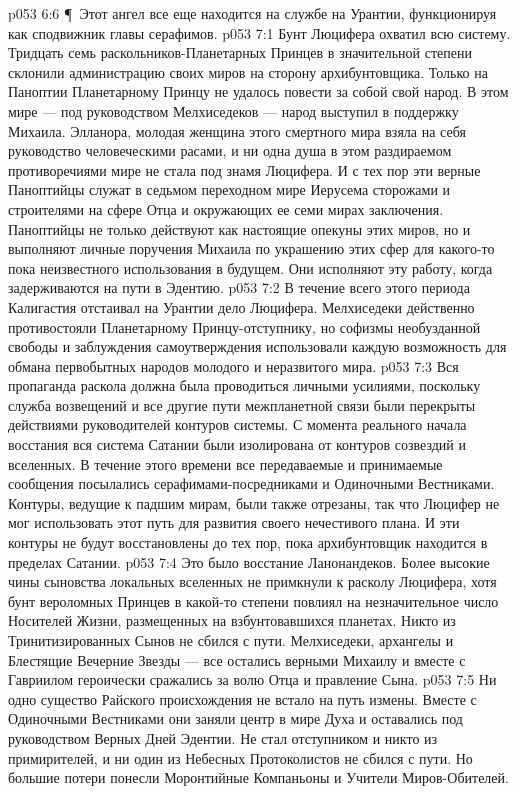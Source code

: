 \vs p053 6:6 \P\ Этот ангел все еще находится на службе на Урантии, функционируя как сподвижник главы серафимов.
\vs p053 7:1 Бунт Люцифера охватил всю систему. Тридцать семь раскольников\hyp{}Планетарных Принцев в значительной степени склонили администрацию своих миров на сторону архибунтовщика. Только на Паноптии Планетарному Принцу не удалось повести за собой свой народ. В этом мире --- под руководством Мелхиседеков --- народ выступил в поддержку Михаила. Элланора, молодая женщина этого смертного мира взяла на себя руководство человеческими расами, и ни одна душа в этом раздираемом противоречиями мире не стала под знамя Люцифера. И с тех пор эти верные Паноптийцы служат в седьмом переходном мире Иерусема сторожами и строителями на сфере Отца и окружающих ее семи мирах заключения. Паноптийцы не только действуют как настоящие опекуны этих миров, но и выполняют личные поручения Михаила по украшению этих сфер для какого\hyp{}то пока неизвестного использования в будущем. Они исполняют эту работу, когда задерживаются на пути в Эдентию.
\vs p053 7:2 В течение всего этого периода Калигастия отстаивал на Урантии дело Люцифера. Мелхиседеки действенно противостояли Планетарному Принцу\hyp{}отступнику, но софизмы необузданной свободы и заблуждения самоутверждения использовали каждую возможность для обмана первобытных народов молодого и неразвитого мира.
\vs p053 7:3 Вся пропаганда раскола должна была проводиться личными усилиями, поскольку служба возвещений и все другие пути межпланетной связи были перекрыты действиями руководителей контуров системы. С момента реального начала восстания вся система Сатании были изолирована от контуров созвездий и вселенных. В течение этого времени все передаваемые и принимаемые сообщения посылались серафимами\hyp{}посредниками и Одиночными Вестниками. Контуры, ведущие к падшим мирам, были также отрезаны, так что Люцифер не мог использовать этот путь для развития своего нечестивого плана. И эти контуры не будут восстановлены до тех пор, пока архибунтовщик находится в пределах Сатании.
\vs p053 7:4 Это было восстание Ланонандеков. Более высокие чины сыновства локальных вселенных не примкнули к расколу Люцифера, хотя бунт вероломных Принцев в какой\hyp{}то степени повлиял на незначительное число Носителей Жизни, размещенных на взбунтовавшихся планетах. Никто из Тринитизированных Сынов не сбился с пути. Мелхиседеки, архангелы и Блестящие Вечерние Звезды --- все остались верными Михаилу и вместе с Гавриилом героически сражались за волю Отца и правление Сына.
\vs p053 7:5 Ни одно существо Райского происхождения не встало на путь измены. Вместе с Одиночными Вестниками они заняли центр в мире Духа и оставались под руководством Верных Дней Эдентии. Не стал отступником и никто из примирителей, и ни один из Небесных Протоколистов не сбился с пути. Но большие потери понесли Моронтийные Компаньоны и Учители Миров\hyp{}Обителей.
